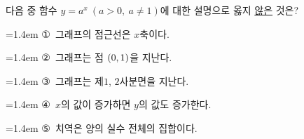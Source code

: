 다음 중 함수 $y=a^x\ (a>0,\ a\ne 1)$에 대한 설명으로 옳지 \underline{않은} 것은?
\par\medskip\par\noindent\hangindent=1.4em {\small ①}\ 그래프의 점근선은 $x$축이다.\par\noindent\hangindent=1.4em {\small ②}\ 그래프는 점 $(0{,}\mkern3mu\mathopen{}1)$을 지난다.\par\noindent\hangindent=1.4em {\small ③}\ 그래프는 제$1$, $2$사분면을 지난다.\par\noindent\hangindent=1.4em {\small ④}\ $x$의 값이 증가하면 $y$의 값도 증가한다.\par\noindent\hangindent=1.4em {\small ⑤}\ 치역은 양의 실수 전체의 집합이다.\par\medskip
